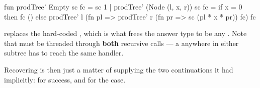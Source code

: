 \begin{parts}
    \begin{solutionorbox}[16em]
      \begin{codeblock}
        fun prodTree' Empty sc fc = sc 1
          | prodTree' (Node (l, x, r)) sc fc =
              if x = 0 then fc ()
              else
                prodTree' l (fn pl =>
                  prodTree' r (fn pr =>
                    sc (pl * x * pr)) fc) fc
      \end{codeblock}

       replaces the hard-coded , which is what frees the answer
      type to be any . Note that  must be threaded through
      \textbf{both} recursive calls --- a  anywhere in either subtree has
      to reach the same handler.

      Recovering  is then just a matter of supplying the two
      continuations it had implicitly:  for success, and
       for the  case.
    \end{solutionorbox}

\end{parts}
